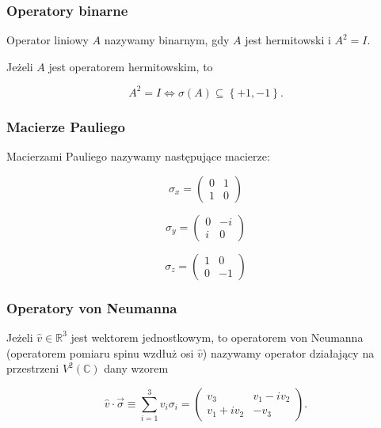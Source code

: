 \subsubsection{Operatory binarne}

\begin{definition}
    Operator liniowy $A$ nazywamy binarnym, gdy $A$ jest hermitowski i $A ^ 2 = I$.
\end{definition}

\begin{fact}
    Jeżeli $A$ jest operatorem hermitowskim, to

    $$
        A ^ {2} = I \Longleftrightarrow \sigma(A) \subseteq \left\{+1,-1\right\}.
    $$
\end{fact}

\subsubsection{Macierze Pauliego}

\begin{definition}
    Macierzami Pauliego nazywamy następujące macierze:

    $$
        \sigma_{x} =
        \begin{pmatrix}
            0 & 1 \\
            1 & 0
        \end{pmatrix}
    $$

    $$
        \sigma_{y} =
        \begin{pmatrix}
            0 & -i \\
            i & 0
        \end{pmatrix}
    $$

    $$
        \sigma_{z} =
        \begin{pmatrix}
            1 & 0 \\
            0 & -1
        \end{pmatrix}
    $$
\end{definition}

\subsubsection{Operatory von Neumanna}

\begin{definition}
    Jeżeli $\hat{v} \in \mathbb{R} ^ 3$ jest wektorem jednostkowym, to operatorem von Neumanna (operatorem pomiaru spinu wzdłuż osi $\hat{v}$) nazywamy operator działający na przestrzeni $V ^ {2} (\mathbb{C})$ dany wzorem

    $$
        \hat{v} \cdot \vec{\sigma} \equiv \sum\limits_{i = 1} ^ {3} v_{i} \sigma_{i} =
        \begin{pmatrix}
            v_3 & v_{1} - i v_{2} \\
            v_{1} + i v_{2} & -v_3
        \end{pmatrix}.
    $$
\end{definition}

